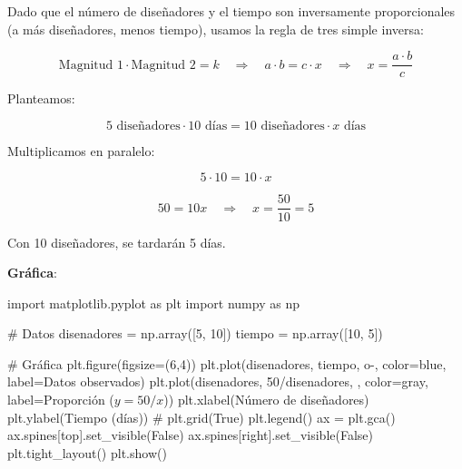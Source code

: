 \documentclass[
  stu,
  floatsintext,
  longtable,
  a4paper,
  nolmodern,
  notxfonts,
  notimes,
  12pt,
  colorlinks=true,linkcolor=blue,citecolor=blue,urlcolor=blue]{apa7}
\newenvironment{Shaded}{\begin{snugshade}}{\end{snugshade}}
\newcommand{\CommentTok}[1]{\textcolor[rgb]{0.37,0.37,0.37}{#1}}
\newcommand{\DecValTok}[1]{\textcolor[rgb]{0.68,0.00,0.00}{#1}}
\newcommand{\ImportTok}[1]{\textcolor[rgb]{0.00,0.46,0.62}{#1}}
\newcommand{\NormalTok}[1]{\textcolor[rgb]{0.00,0.23,0.31}{#1}}
\newcommand{\OperatorTok}[1]{\textcolor[rgb]{0.37,0.37,0.37}{#1}}
\newcommand{\StringTok}[1]{\textcolor[rgb]{0.13,0.47,0.30}{#1}}
\newcommand{\VariableTok}[1]{\textcolor[rgb]{0.07,0.07,0.07}{#1}}
\begin{document}
Dado que el número de diseñadores y el tiempo son inversamente
proporcionales (a más diseñadores, menos tiempo), usamos la regla de
tres simple inversa:

\[
\text{Magnitud 1} \cdot \text{Magnitud 2} = k \quad \Rightarrow \quad a \cdot b = c \cdot x \quad \Rightarrow \quad x = \frac{a \cdot b}{c}
\]

Planteamos:

\[
5 \text{ diseñadores} \cdot 10 \text{ días} = 10 \text{ diseñadores} \cdot x \text{ días}
\]

Multiplicamos en paralelo:

\[
5 \cdot 10 = 10 \cdot x
\]

\[
50 = 10x \quad \Rightarrow \quad x = \frac{50}{10} = 5
\]

Con 10 diseñadores, se tardarán 5 días.

\textbf{Gráfica}:

\begin{Shaded}
\begin{Highlighting}[]
\ImportTok{import}\NormalTok{ matplotlib.pyplot }\ImportTok{as}\NormalTok{ plt}
\ImportTok{import}\NormalTok{ numpy }\ImportTok{as}\NormalTok{ np}

\CommentTok{\# Datos}
\NormalTok{disenadores }\OperatorTok{=}\NormalTok{ np.array([}\DecValTok{5}\NormalTok{, }\DecValTok{10}\NormalTok{])}
\NormalTok{tiempo }\OperatorTok{=}\NormalTok{ np.array([}\DecValTok{10}\NormalTok{, }\DecValTok{5}\NormalTok{])}

\CommentTok{\# Gráfica}
\NormalTok{plt.figure(figsize}\OperatorTok{=}\NormalTok{(}\DecValTok{6}\NormalTok{,}\DecValTok{4}\NormalTok{))}
\NormalTok{plt.plot(disenadores, tiempo, }\StringTok{\textquotesingle{}o{-}\textquotesingle{}}\NormalTok{, color}\OperatorTok{=}\StringTok{\textquotesingle{}blue\textquotesingle{}}\NormalTok{, label}\OperatorTok{=}\StringTok{\textquotesingle{}Datos observados\textquotesingle{}}\NormalTok{)}
\NormalTok{plt.plot(disenadores, }\DecValTok{50}\OperatorTok{/}\NormalTok{disenadores, }\StringTok{\textquotesingle{}{-}{-}\textquotesingle{}}\NormalTok{, color}\OperatorTok{=}\StringTok{\textquotesingle{}gray\textquotesingle{}}\NormalTok{, label}\OperatorTok{=}\StringTok{\textquotesingle{}Proporción ($y = 50/x$)\textquotesingle{}}\NormalTok{)}
\NormalTok{plt.xlabel(}\StringTok{\textquotesingle{}Número de diseñadores\textquotesingle{}}\NormalTok{)}
\NormalTok{plt.ylabel(}\StringTok{\textquotesingle{}Tiempo (días)\textquotesingle{}}\NormalTok{)}
\CommentTok{\# plt.grid(True)}
\NormalTok{plt.legend()}
\NormalTok{ax }\OperatorTok{=}\NormalTok{ plt.gca()}
\NormalTok{ax.spines[}\StringTok{\textquotesingle{}top\textquotesingle{}}\NormalTok{].set\_visible(}\VariableTok{False}\NormalTok{)}
\NormalTok{ax.spines[}\StringTok{\textquotesingle{}right\textquotesingle{}}\NormalTok{].set\_visible(}\VariableTok{False}\NormalTok{)}
\NormalTok{plt.tight\_layout()}
\NormalTok{plt.show()}
\end{Highlighting}
\end{Shaded}
\end{document}
